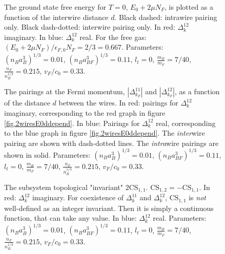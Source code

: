 \begin{figure} 
\begin{center}  
  
\caption{The ground state free energy for $T = 0$, $E_0 + 2\mu N_F$, is plotted as a function of the interwire distance $d$. Black dashed: intrawire pairing only. Black dash-dotted: interwire pairing only. In red: $\Delta^{12}_k$ imaginary. In blue: $\Delta^{12}_k$ real. For the free gas: $(E_0 + 2\mu N_F)/\epsilon_{F,0}N_F = 2/3 = 0.667$. Parameters: $(n_Ba_B^3)^{1/3} = 0.01$, $(n_Ba_{BF}^3)^{1/3} = 0.11$, $l_t = 0$, $\frac{m_B}{m_F} = 7/40$, $\frac{n_F}{n_B^{1/3}} = 0.215$, $v_F/c_0 = 0.33$. }  
\label{fig.2wiresE0ddepend}  
\vspace{0.5cm}
  
\caption{The pairings at the Fermi momentum, $\left|\Delta^{11}_{k_F}\right|$ and $\left|\Delta^{12}_{k_F}\right|$, as a function of the distance $d$ between the wires. In red: pairings for $\Delta^{12}_k$ imaginary, corresponding to the red graph in figure \ref{fig.2wiresE0ddepend}. In blue: Pairings for $\Delta^{12}_k$ real, corresponding to the blue graph in figure \ref{fig.2wiresE0ddepend}. The \textit{inter}wire pairing are shown with dash-dotted lines. The \textit{intra}wire pairings are shown in solid. Parameters: $(n_Ba_B^3)^{1/3} = 0.01$, $(n_Ba_{BF}^3)^{1/3} = 0.11$, $l_t = 0$, $\frac{m_B}{m_F} = 7/40$, $\frac{n_F}{n_B^{1/3}} = 0.215$, $v_F/c_0 = 0.33$. }  
\label{fig.2wiresMaximalPairingddepend}
\end{center}
\end{figure}

\begin{figure}
\begin{center}
  
\caption{The subsystem topological "invariant" $2\text{CS}_{1,1}$. $\text{CS}_{1,2} = - \text{CS}_{1,1}$. In red: $\Delta^{12}_k$ imaginary. For coexistence of $\Delta^{11}_k$ and $\Delta^{12}_k$, $\text{CS}_{1,1}$ is \textit{not} well-defined as an integer invariant. Then it is simply a continuous function, that can take any value. In blue: $\Delta^{12}_k$ real. Parameters: $(n_Ba_B^3)^{1/3} = 0.01$, $(n_Ba_{BF}^3)^{1/3} = 0.11$, $l_t = 0$, $\frac{m_B}{m_F} = 7/40$, $\frac{n_F}{n_B^{1/3}} = 0.215$, $v_F/c_0 = 0.33$. }  
\label{fig.2wiresCS11ddepend}
\end{center}    
\end{figure}

